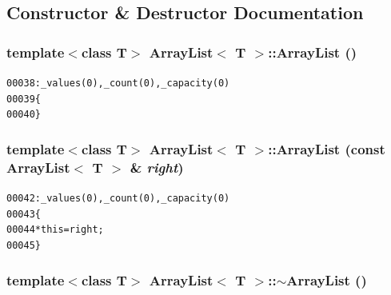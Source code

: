 \subsection{Constructor \& Destructor Documentation}
\hypertarget{class_array_list_a77ba51ae82bb2246563af5c4d64d438e}{
\subsubsection[{ArrayList}]{\setlength{\rightskip}{0pt plus 5cm}template$<$class T$>$ {\bf ArrayList}$<$ T $>$::{\bf ArrayList} ()}}
\label{class_array_list_a77ba51ae82bb2246563af5c4d64d438e}




\begin{footnotesize}\begin{alltt}
00038                     : \_values(0), \_count(0), \_capacity(0)
00039         \{
00040         \}
\end{alltt}\end{footnotesize}


\hypertarget{class_array_list_aa4936cd0b9423eba7a9f38f3c62cfc7c}{
\subsubsection[{ArrayList}]{\setlength{\rightskip}{0pt plus 5cm}template$<$class T$>$ {\bf ArrayList}$<$ T $>$::{\bf ArrayList} (const {\bf ArrayList}$<$ T $>$ \& {\em right})}}
\label{class_array_list_aa4936cd0b9423eba7a9f38f3c62cfc7c}




\begin{footnotesize}\begin{alltt}
00042                                           : \_values(0), \_count(0), \_capacity(0)
00043         \{
00044                 *\textcolor{keyword}{this} = right;
00045         \}
\end{alltt}\end{footnotesize}


\hypertarget{class_array_list_a4af637822f64b61267b1e0ed4d4fca33}{
\subsubsection[{$\sim$ArrayList}]{\setlength{\rightskip}{0pt plus 5cm}template$<$class T$>$ {\bf ArrayList}$<$ T $>$::$\sim${\bf ArrayList} ()}}
\label{class_array_list_a4af637822f64b61267b1e0ed4d4fca33}




